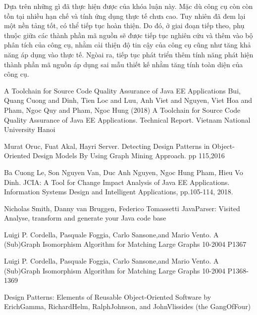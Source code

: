 \documentclass[12pt]{report}
\begin{document}
\noindent Dựa trên những gì đã thực hiện được của khóa luận này. Mặc dù công cụ còn còn tồn tại nhiều hạn chế và tính ứng dụng thực tế chưa cao. Tuy nhiên đã đem lại một nền tảng tốt, có thể tiếp tục hoàn thiện. Do đó, ở giai đoạn tiếp theo, phụ thuộc giữa các thành phần mã nguồn sẽ được tiếp tục nghiên cứu và thêm vào bộ phân tích của công cụ, nhằm cải thiện độ tin cậy của công cụ cũng như tăng khả năng áp dụng vào thực tế. Ngòai ra, tiếp tục phát triển thêm tính năng phát hiện thành phần mã nguồn áp dụng sai mẫu thiết kế nhằm tăng tính toàn diện của công cụ.
\begin{thebibliography}{9}
	A Toolchain for Source Code Quality Assurance of Java EE Applications
	Bui, Quang Cuong and Dinh, Tien Loc and Luu, Anh Viet and Nguyen, Viet Hoa and Pham, Ngoc Quy and Pham, Ngoc Hung (2018) A Toolchain for Source Code Quality Assurance of Java EE Applications. Technical Report. Vietnam National University Hanoi
	
	 Murat Oruc, Fuat Akal, Hayri Server. Detecting Design Patterns in  Object-Oriented Design Models By Using Graph Mining Approach. pp 115,2016
	
	Ba Cuong Le, Son Nguyen Van, Duc Anh Nguyen, Ngoc Hung Pham, Hieu Vo Dinh. JCIA: A Tool for Change Impact Analysis of Java EE Applications. Information Systems Design and Intelligent Applications, pp.105-114, 2018.
	
	Nicholas Smith, Danny van Bruggen, Federico Tomassetti
	JavaParser: Visited
	Analyse, transform and generate your Java code base
	
	Luigi P. Cordella, Pasquale Foggia, Carlo Sansone,and Mario Vento. A (Sub)Graph Isomorphism Algorithm for
	Matching Large Graphs 10-2004 P1367
	
	Luigi P. Cordella, Pasquale Foggia, Carlo Sansone,and Mario Vento. A (Sub)Graph Isomorphism Algorithm for
	Matching Large Graphs 10-2004 P1368-1369
	
	Design Patterns: Elements of Reusable Object-Oriented Software by ErichGamma, RichardHelm, RalphJohnson, and JohnVlissides (the GangOfFour)
\end{thebibliography}
\end{document}
